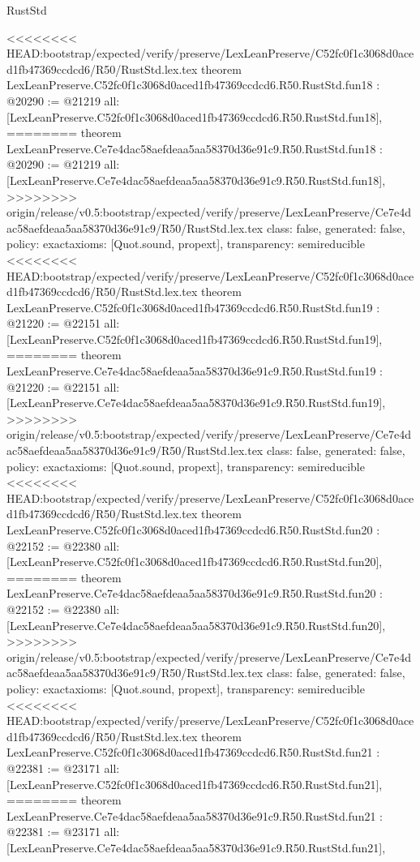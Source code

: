 \begin{lexlean}{RustStd}
\begin{coremodule}
{\begin{coremodule}
{{{{{{{{{{{{{{{{{{{{{}
<<<<<<<< HEAD:bootstrap/expected/verify/preserve/LexLeanPreserve/C52fc0f1c3068d0aced1fb47369ccdcd6/R50/RustStd.lex.tex
theorem LexLeanPreserve.C52fc0f1c3068d0aced1fb47369ccdcd6.R50.RustStd.fun18 : @20290 := @21219 {
  all: [LexLeanPreserve.C52fc0f1c3068d0aced1fb47369ccdcd6.R50.RustStd.fun18],
========
theorem LexLeanPreserve.Ce7e4dac58aefdeaa5aa58370d36e91c9.R50.RustStd.fun18 : @20290 := @21219 {
  all: [LexLeanPreserve.Ce7e4dac58aefdeaa5aa58370d36e91c9.R50.RustStd.fun18],
>>>>>>>> origin/release/v0.5:bootstrap/expected/verify/preserve/LexLeanPreserve/Ce7e4dac58aefdeaa5aa58370d36e91c9/R50/RustStd.lex.tex
  class: false,
  generated: false,
  policy: exact{axioms: [Quot.sound, propext]},
  transparency: semireducible
}
<<<<<<<< HEAD:bootstrap/expected/verify/preserve/LexLeanPreserve/C52fc0f1c3068d0aced1fb47369ccdcd6/R50/RustStd.lex.tex
theorem LexLeanPreserve.C52fc0f1c3068d0aced1fb47369ccdcd6.R50.RustStd.fun19 : @21220 := @22151 {
  all: [LexLeanPreserve.C52fc0f1c3068d0aced1fb47369ccdcd6.R50.RustStd.fun19],
========
theorem LexLeanPreserve.Ce7e4dac58aefdeaa5aa58370d36e91c9.R50.RustStd.fun19 : @21220 := @22151 {
  all: [LexLeanPreserve.Ce7e4dac58aefdeaa5aa58370d36e91c9.R50.RustStd.fun19],
>>>>>>>> origin/release/v0.5:bootstrap/expected/verify/preserve/LexLeanPreserve/Ce7e4dac58aefdeaa5aa58370d36e91c9/R50/RustStd.lex.tex
  class: false,
  generated: false,
  policy: exact{axioms: [Quot.sound, propext]},
  transparency: semireducible
}
<<<<<<<< HEAD:bootstrap/expected/verify/preserve/LexLeanPreserve/C52fc0f1c3068d0aced1fb47369ccdcd6/R50/RustStd.lex.tex
theorem LexLeanPreserve.C52fc0f1c3068d0aced1fb47369ccdcd6.R50.RustStd.fun20 : @22152 := @22380 {
  all: [LexLeanPreserve.C52fc0f1c3068d0aced1fb47369ccdcd6.R50.RustStd.fun20],
========
theorem LexLeanPreserve.Ce7e4dac58aefdeaa5aa58370d36e91c9.R50.RustStd.fun20 : @22152 := @22380 {
  all: [LexLeanPreserve.Ce7e4dac58aefdeaa5aa58370d36e91c9.R50.RustStd.fun20],
>>>>>>>> origin/release/v0.5:bootstrap/expected/verify/preserve/LexLeanPreserve/Ce7e4dac58aefdeaa5aa58370d36e91c9/R50/RustStd.lex.tex
  class: false,
  generated: false,
  policy: exact{axioms: [Quot.sound, propext]},
  transparency: semireducible
}
<<<<<<<< HEAD:bootstrap/expected/verify/preserve/LexLeanPreserve/C52fc0f1c3068d0aced1fb47369ccdcd6/R50/RustStd.lex.tex
theorem LexLeanPreserve.C52fc0f1c3068d0aced1fb47369ccdcd6.R50.RustStd.fun21 : @22381 := @23171 {
  all: [LexLeanPreserve.C52fc0f1c3068d0aced1fb47369ccdcd6.R50.RustStd.fun21],
========
theorem LexLeanPreserve.Ce7e4dac58aefdeaa5aa58370d36e91c9.R50.RustStd.fun21 : @22381 := @23171 {
  all: [LexLeanPreserve.Ce7e4dac58aefdeaa5aa58370d36e91c9.R50.RustStd.fun21],
}}}}}}}}}}}}}}}}}}}}}}}}}
\end{coremodule}}
\end{coremodule}
\end{lexlean}
